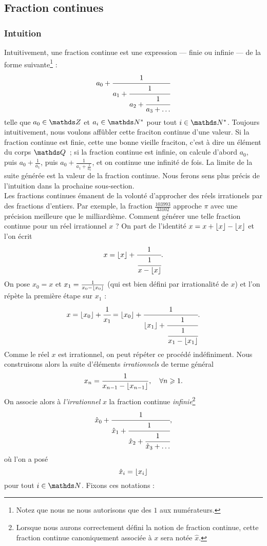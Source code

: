 \subsection{Fraction continues}
\subsubsection{Intuition}

Intuitivement, une fraction continue est une expression — finie ou infinie — de
la forme suivante\footnote{Notez que nous ne nous autorisons que des $1$ aux
numérateurs.} : \[a_0 + \cfrac{1}{a_1 + \cfrac{1}{a_2 + \cfrac{1}{a_3 +
\dots}}}\] telle que $a_0\in \Z$ et $a_i \in \N^*$ pour tout $i\in \N^*$.
Toujours intuitivement, nous voulons affûbler cette fraciton continue d'une
valeur. Si la fraction continue est finie, cette une bonne vieille fraciton,
c'est à dire un élément du corps $\Q$~; si la fraction continue est infinie, on
calcule d'abord $a_0$, puis $a_0 + \frac{1}{a_1}$, puis $a_0 + \frac{1}{a_1
+\frac{1}{a_2}}$, et on continue une infinité de fois. La limite de la suite
générée est la \og{} valeur \fg{} de la fraction continue. Nous ferons sens
plus précis de l'intuition dans la prochaine sous-section. \\

Les fractions continues émanent de la volonté d'approcher des réels irrationels
par des fractions d'entiers. Par exemple, la fraction $\frac{103 993}{33 102}$
approche $\pi$ avec une précision meilleure que le milliardième.  Comment
générer une telle fraction continue pour un réel irrationnel $x$ ?  On part de
l'identité $x = x + \lfloor x\rfloor - \lfloor x\rfloor$ et l'on écrit \[x = \lfloor x\rfloor +
\cfrac{1}{\cfrac{1}{x - \lfloor x\rfloor}}.\] On pose $x_0 = x$ et $x_1 = \frac{1}{x_0 -
\lfloor x_0\rfloor}$ (qui est bien défini par irrationalité de $x$) et l'on répète la
première étape sur $x_1$ : \[x = \lfloor x_0\rfloor + \cfrac{1}{x_1} = \lfloor x_0\rfloor +
\cfrac{1}{\lfloor x_1\rfloor + \cfrac{1}{\cfrac{1}{x_1 - \lfloor x_1\rfloor}}}.\] Comme le réel
$x$ est irrationnel, on peut répéter ce procédé indéfiniment. Nous construisons
alors la suite d'éléments \emph{irrationnels} de terme général \[x_n =
\frac{1}{x_{n-1} - \lfloor x_{n-1}\rfloor}, \quad \forall n \geqslant 1.\] On associe alors à
\emph{l'irrationnel} $x$ la fraction continue \emph{infinie}\footnote{Lorsque
nous aurons correctement défini la notion de fraction continue, cette fraction
continue canoniquement associée à $x$ sera notée $\hat{x}$.} \[\hat{x}_0 +
\cfrac{1}{\hat{x}_1 + \cfrac{1}{\hat{x}_2 + \cfrac{1}{\hat{x}_3 + \dots}}},\]
où l'on a posé \[\hat{x}_i = \lfloor x_i\rfloor\] pour tout $i\in \N$. Fixons ces
notations :

